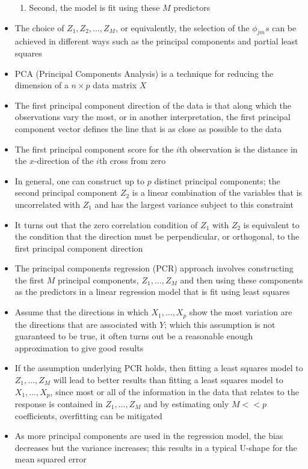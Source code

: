 \documentclass[12pt]{article}
\begin{document}
\begin{itemize}
\begin{enumerate}
\item Second, the model is fit using these $M$ predictors \end{enumerate} 
\item The choice of $Z_1,Z_2,\dots,Z_M$, or equivalently, the selection of the $\phi_{jm}s$ can be achieved in different ways such as the principal components and partial least squares 
\item PCA (Principal Components Analysis) is a technique for reducing the dimension of a $n \times p$ data matrix $X$ 
\item The first principal component direction of the data is that along which the observations vary the most, or in another interpretation, the first principal component vector defines the line that is as close as possible to the data 
\item The first principal component score for the $i$th observation is the distance in the $x$-direction of the $i$th cross from zero 
\item In general, one can construct up to $p$ distinct principal components; the second principal component $Z_2$ is a linear combination of the variables that is uncorrelated with $Z_1$ and has the largest variance subject to this constraint 
\item It turns out that the zero correlation condition of $Z_1$ with $Z_2$ is equivalent to the condition that the direction must be perpendicular, or orthogonal, to the first principal component direction 
\item The principal components regression (PCR) approach involves constructing the first $M$ principal components, $Z_1,\dots,Z_M$ and then using these components as the predictors in a linear regression model that is fit using least squares
\item Assume that the directions in which $X_1,\dots,X_p$ show the most variation are the directions that are associated with $Y$; which this assumption is not guaranteed to be true, it often turns out be a reasonable enough approximation to give good results 
\item If the assumption underlying PCR holds, then fitting a least squares model to $Z_1,\dots,Z_M$ will lead to better results than fitting a least squares model to $X_1,\dots,X_p$, since most or all of the information in the data that relates to the response is contained in $Z_1,\dots,Z_M$ and by estimating only $M << p$ coefficients, overfitting can be mitigated 
\item As more principal components are used in the regression model, the bias decreases but the variance increases; this results in a typical U-shape for the mean squared error 

\end{itemize}
\end{document}
